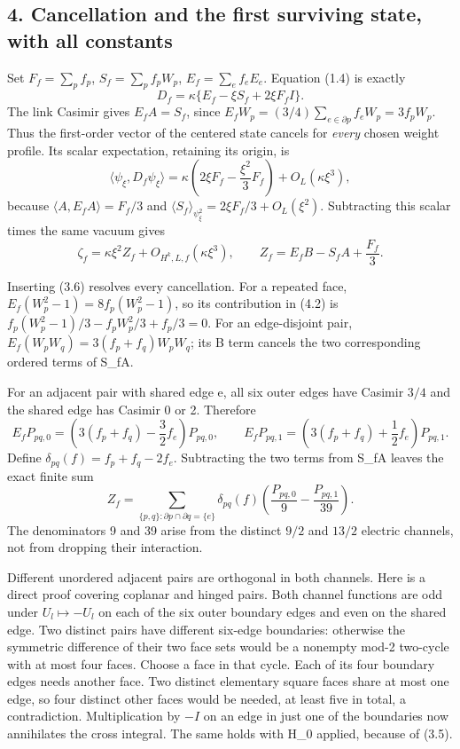 \documentclass[
  11pt,
]{article}
\begin{document}
\subsection{4. Cancellation and the first surviving state, with all
constants}\label{magnetic-part-3-cancellation-and-the-first-surviving-state-with-all-constants}

Set \(F_f=\sum_pf_p\), \(S_f=\sum_pf_pW_p\), \(E_f=\sum_ef_eE_e\).
Equation (1.4) is exactly \[
 D_f=\kappa\{E_f-\xi S_f+2\xi F_fI\}.
\tag{4.1}
\] The link Casimir gives \(E_fA=S_f\), since
\(E_fW_p=(3/4)\sum_{e\in\partial p}f_eW_p=3f_pW_p\). Thus the
first-order vector of the centered state cancels for \emph{every} chosen
weight profile. Its scalar expectation, retaining its origin, is \[
 \langle\psi_\xi,D_f\psi_\xi\rangle
 =\kappa\left(2\xi F_f-\frac{\xi^2}3F_f\right)+O_L(\kappa\xi^3),
\] because \(\langle A,E_fA\rangle=F_f/3\) and
\(\langle S_f\rangle_{\psi_\xi^2}=2\xi F_f/3+O_L(\xi^2)\). Subtracting
this scalar times the same vacuum gives \[
 \zeta_f=\kappa\xi^2 Z_f+O_{H^k,L,f}(\kappa\xi^3),\qquad
 Z_f=E_fB-S_fA+\frac{F_f}{3}.
\tag{4.2}
\]

Inserting (3.6) resolves every cancellation. For a repeated face,
\(E_f(W_p^2-1)=8f_p(W_p^2-1)\), so its contribution in (4.2) is
\(f_p(W_p^2-1)/3-f_pW_p^2/3+f_p/3=0\). For an edge-disjoint pair,
\(E_f(W_pW_q)=3(f_p+f_q)W_pW_q\); its B term cancels the two
corresponding ordered terms of S\_fA.

For an adjacent pair with shared edge e, all six outer edges have
Casimir \(3/4\) and the shared edge has Casimir 0 or 2. Therefore \[
 E_fP_{pq,0}=\left(3(f_p+f_q)-\frac32f_e\right)P_{pq,0},\qquad
 E_fP_{pq,1}=\left(3(f_p+f_q)+\frac12f_e\right)P_{pq,1}.
\] Define \(\delta_{pq}(f)=f_p+f_q-2f_e\). Subtracting the two terms
from S\_fA leaves the exact finite sum \[
 \boxed{Z_f=\sum_{\{p,q\}:\partial p\cap\partial q=\{e\}}
 \delta_{pq}(f)\left(\frac{P_{pq,0}}9-\frac{P_{pq,1}}{39}\right).}
\tag{4.3}
\] The denominators 9 and 39 arise from the distinct \(9/2\) and
\(13/2\) electric channels, not from dropping their interaction.

Different unordered adjacent pairs are orthogonal in both channels. Here
is a direct proof covering coplanar and hinged pairs. Both channel
functions are odd under \(U_l\mapsto -U_l\) on each of the six outer
boundary edges and even on the shared edge. Two distinct pairs have
different six-edge boundaries: otherwise the symmetric difference of
their two face sets would be a nonempty mod-2 two-cycle with at most
four faces. Choose a face in that cycle. Each of its four boundary edges
needs another face. Two distinct elementary square faces share at most
one edge, so four distinct other faces would be needed, at least five in
total, a contradiction. Multiplication by \(-I\) on an edge in just one
of the boundaries now annihilates the cross integral. The same holds
with H\_0 applied, because of (3.5).
\end{document}
